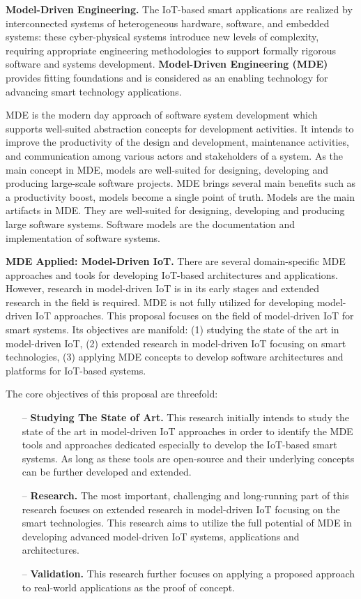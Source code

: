\documentclass[10pt, oneside]{article}
\begin{document}
\textbf{Model-Driven Engineering.} The IoT-based smart applications are realized by interconnected systems of heterogeneous hardware, software, and embedded systems: these cyber-physical systems introduce new levels of complexity, requiring appropriate engineering methodologies to support formally rigorous software and systems development. \textbf{Model-Driven Engineering (MDE)} provides fitting foundations and is considered as an enabling technology for advancing smart technology applications.

MDE is the modern day approach of software system development which supports well-suited abstraction concepts for development activities. It intends to improve the productivity of the design and development, maintenance activities, and communication among various actors and stakeholders of a system. As the main concept in MDE, models are well-suited for designing, developing and producing large-scale software projects. MDE brings several main benefits such as a productivity boost, models become a single point of truth. Models are the main artifacts in MDE. They are well-suited for designing, developing and producing large software systems. Software models are the documentation and implementation of software systems.

\textbf{MDE Applied: Model-Driven IoT.} There are several domain-specific MDE approaches and tools for developing IoT-based architectures and applications. However, research in model-driven IoT is in its early stages and extended research in the field is required. MDE is not fully utilized for developing model-driven IoT approaches. This proposal focuses on the field of model-driven IoT for smart systems. Its objectives are manifold: (1) studying the state of the art in model-driven IoT, (2) extended research in model-driven IoT focusing on smart technologies, (3) applying MDE concepts to develop software architectures and platforms for IoT-based systems.

The core objectives of this proposal are threefold:
\begin{itemize}
\item[--] \textbf{Studying The State of Art.} This research initially intends to study the state of the art in model-driven IoT approaches in order to identify the MDE tools and approaches dedicated especially to develop the IoT-based smart systems. As long as these tools are open-source and their underlying concepts can be further developed and extended. 
\item[--] \textbf{Research.} The most important, challenging and long-running part of this research focuses on extended research in model-driven IoT focusing on the smart technologies. This research aims to utilize the full potential of MDE in developing advanced model-driven IoT systems, applications and architectures.
\item[--] \textbf{Validation.} This research further focuses on applying a proposed approach to real-world applications as the proof of concept.
\end{itemize}
\end{document}
